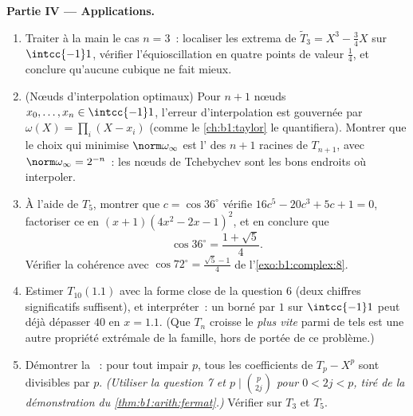 \begin{problem}
\medskip
\noindent\textbf{Partie IV --- Applications.}
\begin{enumerate}[resume]
  \item Traiter à la main le cas $n = 3$~: localiser les extrema de
        $\widetilde T_3 = X^3 - \frac34X$ sur $\intcc{-1}1$,
        vérifier l'équioscillation en quatre points de valeur
        $\frac14$, et conclure qu'aucune cubique  ne fait
        mieux.
  \item (Nœuds d'interpolation optimaux) Pour $n + 1$ nœuds $x_0,
        \dots, x_n \in \intcc{-1}1$, l'erreur d'interpolation est
        gouvernée par $\omega(X) = \prod_i (X - x_i)$ (comme le
        \cref{ch:b1:taylor} le quantifiera). Montrer que le choix
        qui minimise $\norm\omega_\infty$ est l' des $n + 1$
        racines de $T_{n+1}$, avec $\norm\omega_\infty = 2^{-n}$~:
        les nœuds de Tchebychev sont les bons endroits où
        interpoler.
  \item À l'aide de $T_5$, montrer que $c = \cos 36^\circ$ vérifie
        $16c^5 - 20c^3 + 5c + 1 = 0$, factoriser ce  en
        $(x + 1)(4x^2 - 2x - 1)^2$, et en conclure que
        \[
        \cos 36^\circ = \frac{1 + \sqrt5}4 .
        \]
        Vérifier la cohérence avec $\cos 72^\circ =
        \frac{\sqrt5 - 1}4$ de l'\cref{exo:b1:complex:8}.
  \item Estimer $T_{10}(1.1)$ avec la forme close de la question 6
        (deux chiffres significatifs suffisent), et interpréter~: un
         borné par $1$ sur $\intcc{-1}1$ peut déjà dépasser
        $40$ en $x = 1.1$. (Que $T_n$ croisse le \emph{plus vite}
        parmi de tels  est une autre propriété extrémale de
        la famille, hors de portée de ce problème.)
  \item Démontrer la ~: pour tout  impair
        $p$, tous les coefficients de $T_p - X^p$ sont divisibles
        par $p$. \emph{(Utiliser la question 7 et $p \mid \binom
        p{2j}$ pour $0 < 2j < p$, tiré de la démonstration du
        \cref{thm:b1:arith:fermat}.)} Vérifier sur $T_3$ et $T_5$.
\end{enumerate}


\end{problem}
